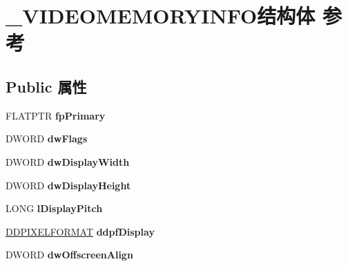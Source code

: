 \hypertarget{struct___v_i_d_e_o_m_e_m_o_r_y_i_n_f_o}{}\section{\+\_\+\+V\+I\+D\+E\+O\+M\+E\+M\+O\+R\+Y\+I\+N\+F\+O结构体 参考}
\label{struct___v_i_d_e_o_m_e_m_o_r_y_i_n_f_o}
\subsection*{Public 属性}
\begin{DoxyCompactItemize}
\item 
\mbox{\label{struct___v_i_d_e_o_m_e_m_o_r_y_i_n_f_o_ae5782132da2e5b19d7e3111b0f8b5b94}} 
F\+L\+A\+T\+P\+TR {\bfseries fp\+Primary}
\item 
\mbox{\label{struct___v_i_d_e_o_m_e_m_o_r_y_i_n_f_o_ae1a2b6d6bddf29d483be4148d5810c2d}} 
D\+W\+O\+RD {\bfseries dw\+Flags}
\item 
\mbox{\label{struct___v_i_d_e_o_m_e_m_o_r_y_i_n_f_o_a3152894ac684d1f6e45da537230d0dad}} 
D\+W\+O\+RD {\bfseries dw\+Display\+Width}
\item 
\mbox{\label{struct___v_i_d_e_o_m_e_m_o_r_y_i_n_f_o_a238fae061eb2327c402f57e1059a31fd}} 
D\+W\+O\+RD {\bfseries dw\+Display\+Height}
\item 
\mbox{\label{struct___v_i_d_e_o_m_e_m_o_r_y_i_n_f_o_a7ad0641b9feb0df716d64f86daf34e7e}} 
L\+O\+NG {\bfseries l\+Display\+Pitch}
\item 
\mbox{\label{struct___v_i_d_e_o_m_e_m_o_r_y_i_n_f_o_ab3362816fc77a9f21b0941947121e883}} 
\hyperlink{struct___d_d_p_i_x_e_l_f_o_r_m_a_t}{D\+D\+P\+I\+X\+E\+L\+F\+O\+R\+M\+AT} {\bfseries ddpf\+Display}
\item 
\mbox{\label{struct___v_i_d_e_o_m_e_m_o_r_y_i_n_f_o_a10106ed755b6216cdbeaaf3af16456a0}} 
D\+W\+O\+RD {\bfseries dw\+Offscreen\+Align}

\end{DoxyCompactItemize}
